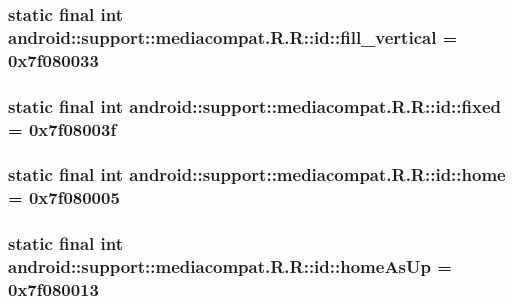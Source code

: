 \hypertarget{classandroid_1_1support_1_1mediacompat_1_1_r_1_1id_d5b2d217ef0b8ec0fb2cdd18e04b0976}{
\subsubsection[{fill\_\-vertical}]{\setlength{\rightskip}{0pt plus 5cm}static final int android::support::mediacompat.R.R::id::fill\_\-vertical = 0x7f080033}}
\label{classandroid_1_1support_1_1mediacompat_1_1_r_1_1id_d5b2d217ef0b8ec0fb2cdd18e04b0976}


\hypertarget{classandroid_1_1support_1_1mediacompat_1_1_r_1_1id_eedaa412155688bed579b3f2d68a5fa0}{
\subsubsection[{fixed}]{\setlength{\rightskip}{0pt plus 5cm}static final int android::support::mediacompat.R.R::id::fixed = 0x7f08003f}}
\label{classandroid_1_1support_1_1mediacompat_1_1_r_1_1id_eedaa412155688bed579b3f2d68a5fa0}


\hypertarget{classandroid_1_1support_1_1mediacompat_1_1_r_1_1id_ef2f9bc2f821e2f070a58097e2463527}{
\subsubsection[{home}]{\setlength{\rightskip}{0pt plus 5cm}static final int android::support::mediacompat.R.R::id::home = 0x7f080005}}
\label{classandroid_1_1support_1_1mediacompat_1_1_r_1_1id_ef2f9bc2f821e2f070a58097e2463527}


\hypertarget{classandroid_1_1support_1_1mediacompat_1_1_r_1_1id_c2805f1616746ff301f7ff55ca5748b3}{
\subsubsection[{homeAsUp}]{\setlength{\rightskip}{0pt plus 5cm}static final int android::support::mediacompat.R.R::id::homeAsUp = 0x7f080013}}
\label{classandroid_1_1support_1_1mediacompat_1_1_r_1_1id_c2805f1616746ff301f7ff55ca5748b3}


